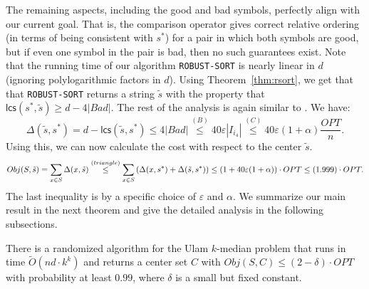 \documentclass[11pt]{llncs}
\newcommand{\veps}{\varepsilon}
\newcommand{\lcs}{{\textsf{lcs}}}
\begin{document}
The remaining aspects, including the good and bad symbols, perfectly align with our current goal. 
That is, the comparison operator gives correct relative ordering (in terms of being consistent with $s^*$) for a pair in which both symbols are good, but if even one symbol in the pair is bad, then no such guarantees exist.
Note that the running time of our algorithm {\tt ROBUST-SORT} is nearly linear in $d$ (ignoring polylogarithmic factors in $d$). 
Using Theorem~\ref{thm:rsort}, we get that that {\tt ROBUST-SORT} returns a string $\tilde{s}$ with the property that $\lcs(s^*, \tilde{s}) \geq d - 4 |Bad|$. 
The rest of the analysis is again similar to \cite{cdk23}. We have:
$$
\Delta(\tilde{s}, s^*) = d - \lcs(\tilde{s}, s^*) \leq 4 |Bad| \stackrel{(B)}{\leq} 40 \veps |I_{i_4}| \stackrel{(C)}{\leq} 40 \veps (1 + \alpha) \frac{OPT}{n}.
$$
Using this, we can now calculate the cost with respect to the center $\tilde{s}$.
$$
Obj(S, \tilde{s}) = \sum_{x \in S} \Delta(x, \tilde{s}) 
\stackrel{(triangle)}{\leq} \sum_{x \in S} \left( \Delta(x, s^*) + \Delta(\tilde{s}, s^*)\right)
\leq \left( 1 + 40 \veps (1+\alpha)\right) \cdot OPT \\
\leq (1.999) \cdot OPT.
$$
The last inequality is by a specific choice of $\veps$ and $\alpha$. We summarize our main result in the next theorem and give the detailed analysis in the following subsections. 

\begin{theorem}
There is a randomized algorithm for the Ulam $k$-median problem that runs in time $\tilde{O}(nd \cdot k^k)$ and returns a center set $C$ with $Obj(S, C) \leq (2-\delta) \cdot OPT$ with probability at least $0.99$, where $\delta$ is a small but fixed constant.
\end{theorem}
\end{document}
